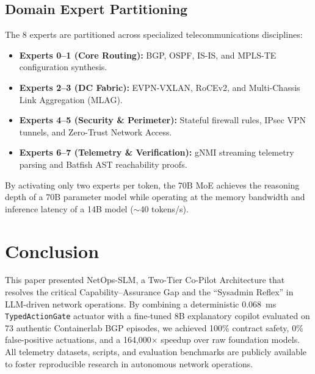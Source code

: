 \documentclass[conference]{IEEEtran}
\begin{document}
\subsection{Domain Expert Partitioning}
The 8 experts are partitioned across specialized telecommunications disciplines:
\begin{itemize}\setlength{\itemsep}{1pt}\setlength{\parskip}{0pt}
    \item \textbf{Experts 0--1 (Core Routing):} BGP, OSPF, IS-IS, and MPLS-TE configuration synthesis.
    \item \textbf{Experts 2--3 (DC Fabric):} EVPN-VXLAN, RoCEv2, and Multi-Chassis Link Aggregation (MLAG).
    \item \textbf{Experts 4--5 (Security \& Perimeter):} Stateful firewall rules, IPsec VPN tunnels, and Zero-Trust Network Access.
    \item \textbf{Experts 6--7 (Telemetry \& Verification):} gNMI streaming telemetry parsing and Batfish AST reachability proofs.
\end{itemize}

By activating only two experts per token, the 70B MoE achieves the reasoning depth of a 70B parameter model while operating at the memory bandwidth and inference latency of a 14B model ($\sim$40 tokens/s).

\newpage
\section{Conclusion}
This paper presented NetOps-SLM, a Two-Tier Co-Pilot Architecture that resolves the critical Capability--Assurance Gap and the ``Sysadmin Reflex'' in LLM-driven network operations. By combining a deterministic 0.068~ms \texttt{TypedActionGate} actuator with a fine-tuned 8B explanatory copilot evaluated on 73 authentic Containerlab BGP episodes, we achieved 100\% contract safety, 0\% false-positive actuations, and a 164,000$\times$ speedup over raw foundation models. All telemetry datasets, scripts, and evaluation benchmarks are publicly available to foster reproducible research in autonomous network operations.



\end{document}
